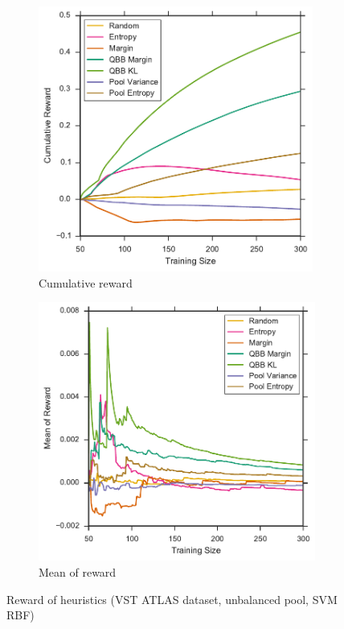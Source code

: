 \begin{figure}[p]
	\centering
	\begin{subfigure}{.5\textwidth}
		\centering
		\includegraphics[width=0.99\textwidth]{figures/5_thompson/vstatlas_ur_sum_rewards}
		\caption{Cumulative reward}
		\label{fig:vstatlas_ur_sum_rewards}
	\end{subfigure}%
	\begin{subfigure}{.5\textwidth}
		\centering
		\includegraphics[width=0.99\linewidth]{figures/5_thompson/vstatlas_ur_avg_rewards}
		\caption{Mean of reward}
		\label{fig:vstatlas_ur_avg_rewards}
	\end{subfigure}
	\caption[Reward of heuristics (VST ATLAS, unbalanced, SVM RBF)]{
		Reward of heuristics (VST ATLAS dataset, unbalanced pool, SVM RBF)}
	\label{fig:vstatlas_ur_rewards}
\end{figure}


